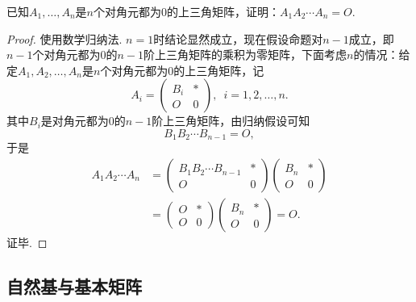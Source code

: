 \begin{example}{}{}
    已知$A_1,\ldots,A_n$是$n$个对角元都为0的上三角矩阵，证明：$A_1A_2\cdots A_n=O$.
\end{example}

\begin{proof}
    使用数学归纳法. $n=1$时结论显然成立，现在假设命题对$n-1$成立，即$n-1$个对角元都为0的$n-1$阶上三角矩阵的乘积为零矩阵，下面考虑$n$的情况：给定$A_1,A_2,\ldots,A_n$是$n$个对角元都为0的上三角矩阵，记
    \[A_i=\begin{pmatrix}
            B_i & * \\ O & 0
        \end{pmatrix},\enspace i=1,2,\ldots,n.\]
    其中$B_i$是对角元都为0的$n-1$阶上三角矩阵，由归纳假设可知
    \[B_1B_2\cdots B_{n-1}=O,\]
    于是
    \begin{align*}
        A_1A_2\cdots A_n
         & =\begin{pmatrix}
                B_1B_2\cdots B_{n-1} & * \\ O & 0
            \end{pmatrix}
        \begin{pmatrix}
            B_n & * \\ O & 0
        \end{pmatrix}                      \\
         & =\begin{pmatrix}
                O & * \\ O & 0
            \end{pmatrix}
        \begin{pmatrix}
            B_n & * \\ O & 0
        \end{pmatrix}=  O.
    \end{align*}
    证毕.
\end{proof}

\subsection{自然基与基本矩阵}

